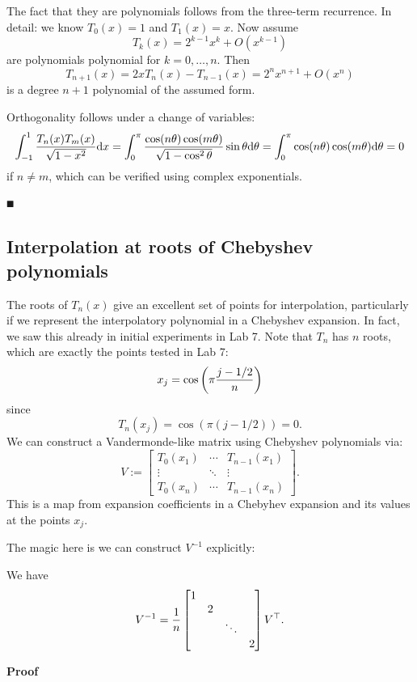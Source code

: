 The fact that they are polynomials follows from the three-term recurrence. In detail: we know $T_0(x) = 1$ and $T_1(x) = x$. Now assume
\[
T_k(x) = 2^{k-1} x^k + O(x^{k-1})
\]
are polynomials polynomial for $k = 0,\ensuremath{\ldots},n$. Then
\[
T_{n+1}(x) = 2x T_n(x) - T_{n-1}(x) = 2^n x^{n+1} + O(x^n)
\]
is a degree $n+1$ polynomial of the assumed form.

Orthogonality follows under a change of variables:
\[
\int_{-1}^1 {T_n(x) T_m(x) \over \sqrt{1-x^2}} {\rm d} x =
\int_0^\ensuremath{\pi} {\cos(n\ensuremath{\theta}) \cos(m\ensuremath{\theta}) \over \sqrt{1-\cos^2 \ensuremath{\theta}}} \sin \ensuremath{\theta} {\rm d} \ensuremath{\theta} =
\int_0^\ensuremath{\pi} \cos(n\ensuremath{\theta}) \cos(m\ensuremath{\theta}) {\rm d} \ensuremath{\theta} = 0
\]
if $n \ensuremath{\neq} m$, which can be verified using complex exponentials.

\ensuremath{\QED}

\subsection{Interpolation at roots of Chebyshev polynomials}
The roots of $T_n(x)$ give an excellent set of points for interpolation, particularly if we represent the interpolatory polynomial in a Chebyshev expansion. In fact, we saw this already in initial experiments in Lab 7. Note that $T_n$ has $n$ roots, which are exactly the points tested in Lab 7:
\[
x_j = \cos\pr(\ensuremath{\pi}{j-1/2 \over n})
\]
since
\[
T_n(x_j) = \cos(\ensuremath{\pi}(j-1/2)) = 0.
\]
We can construct a Vandermonde-like matrix using Chebyshev polynomials via:
\[
V := \begin{bmatrix}
T_0(x_1) & \ensuremath{\cdots} & T_{n-1}(x_1) \\
\ensuremath{\vdots} & \ensuremath{\ddots} & \ensuremath{\vdots} \\
T_0(x_n) & \ensuremath{\cdots} & T_{n-1}(x_n)
\end{bmatrix}.
\]
This is a map from expansion coefficients in a Chebyhev expansion and its values at the points $x_j$.

The magic here is we can construct $V^{-1}$ explicitly:

\begin{theorem} We have
\[
V^{-1} = {1 \over n} \begin{bmatrix}
1 \\
 & 2 \\
 && \ensuremath{\ddots} \\
 &&& 2
 \end{bmatrix} V^\ensuremath{\top}.
\]
\end{theorem}
\textbf{Proof}

